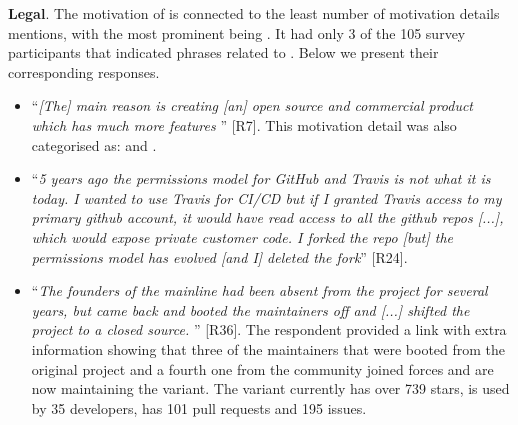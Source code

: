 \nd \textbf{Legal}. The motivation of  is connected to the least number of motivation details mentions, with the most prominent being . It had only 3 of the 105 survey participants that indicated phrases related to . Below we present their corresponding responses.

\begin{itemize}[leftmargin=*]
\item ``\emph{[The] main reason is creating [an] open source and commercial product which has much more features%
}'' [R7]. This motivation detail was also categorised as:  and .

\item ``\emph{5 years ago the permissions model for GitHub and Travis is not what it is today. I wanted to use Travis for CI/CD but if I granted Travis access to my primary github account, it would have read access to all the github repos [...], which would expose private customer code. I forked the repo [but] the permissions model has evolved [and I] %
deleted the fork}'' [R24].

\item ``\emph{The founders of the mainline had been absent from the project for several years, but came back and booted the maintainers off and
[...] shifted the project to a closed source. %
}'' [R36]. %
The respondent provided a link with extra information showing that three of the maintainers that were booted from the original project and a fourth one from the community joined forces and are now maintaining the variant. The variant currently has over 739 stars, is used by 35 developers, has 101 pull requests and 195 issues.
\end{itemize}


